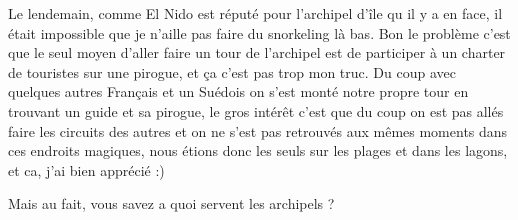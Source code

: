 \begin{multicols}{2}

Le lendemain, comme El Nido est réputé pour l'archipel d'île qu il y a en face, il était impossible que je n'aille pas faire du snorkeling là bas. Bon le problème c'est que le seul moyen d'aller faire un tour de l'archipel est de participer à un charter de touristes sur une pirogue, et ça c'est pas trop mon truc. Du coup avec quelques autres Français et un Suédois on s'est monté notre propre tour en trouvant un guide et sa pirogue, le gros intérêt c'est que du coup on est pas allés faire les circuits des autres et on ne s'est pas retrouvés aux mêmes moments dans ces endroits magiques, nous étions donc les seuls sur les plages et dans les lagons, et ca, j'ai bien apprécié :)


Mais au fait, vous savez a quoi servent les archipels ?

\end{multicols}


